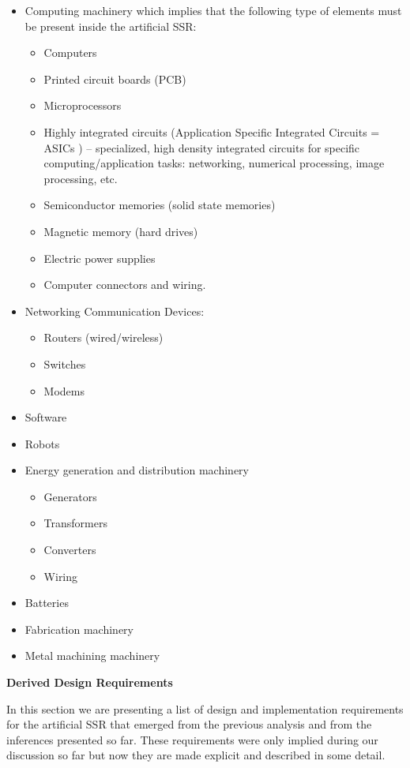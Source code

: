 \bigskip

\begin{itemize}
\item Computing machinery which implies that the following type of
elements must be present inside the artificial SSR:

\begin{itemize}
\item Computers
\item Printed circuit boards (PCB)
\item Microprocessors
\item Highly integrated circuits (Application Specific Integrated
Circuits = ASICs ) – specialized, high density integrated circuits for
specific computing/application tasks: networking, numerical processing,
image processing, etc.
\item Semiconductor memories (solid state memories)
\item Magnetic memory (hard drives)
\item Electric power supplies
\item Computer connectors and wiring.
\end{itemize}
\item Networking Communication Devices:

\begin{itemize}
\item Routers (wired/wireless)
\item Switches
\item Modems
\end{itemize}
\item Software
\item Robots
\item Energy generation and distribution machinery

\begin{itemize}
\item Generators
\item Transformers
\item Converters
\item Wiring
\end{itemize}
\item Batteries
\item Fabrication machinery
\item Metal machining machinery
\end{itemize}
{\bfseries
\hypertarget{RefHeading3128306210128}{}Derived Design Requirements}

In this section we are presenting a list of design and implementation
requirements for the artificial SSR that emerged from the previous
analysis and from the inferences presented so far. These requirements
were only implied during our discussion so far but now they are made
explicit and described in some detail.


